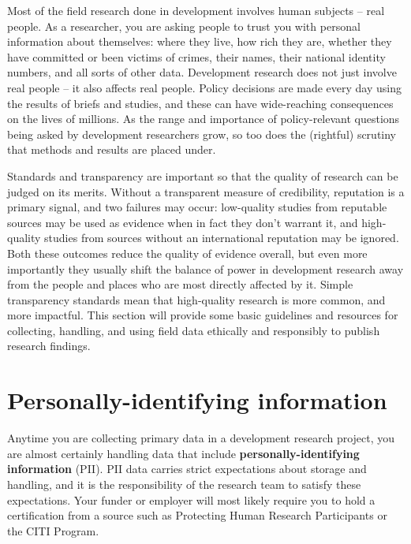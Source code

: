 
\begin{fullwidth}
Most of the field research done in development involves human subjects -- real people.
As a researcher, you are asking people to trust you with personal information about themselves:
where they live, how rich they are, whether they have committed or been victims of crimes,
their names, their national identity numbers, and all sorts of other data.
Development research does not just involve real people -- it also affects real people.
Policy decisions are made every day using the results of briefs and studies,
and these can have wide-reaching consequences on the lives of millions.
As the range and importance of policy-relevant questions being asked by development researchers grow,
so too does the (rightful) scrutiny that methods and results are placed under.

Standards and transparency are important so that the quality of research can be judged on its merits.
Without a transparent measure of credibility, reputation is a primary signal, and two failures may occur:
low-quality studies from reputable sources may be used as evidence when in fact they don't warrant it,
and high-quality studies from sources without an international reputation may be ignored.
Both these outcomes reduce the quality of evidence overall,
but even more importantly they usually shift the balance of power in development research
away from the people and places who are most directly affected by it.
Simple transparency standards mean that high-quality research is more common, and more impactful.
This section will provide some basic guidelines and resources
for collecting, handling, and using field data ethically and responsibly to publish research findings.
\end{fullwidth}

\section{Personally-identifying information}

Anytime you are collecting primary data in a development research project,
you are almost certainly handling data that include \textbf{personally-identifying information} (PII).
PII data carries strict expectations about storage and handling,
and it is the responsibility of the research team to satisfy these expectations.
Your funder or employer will most likely require you to hold a certification from a source
such as Protecting Human Research Participants
or the CITI Program.

